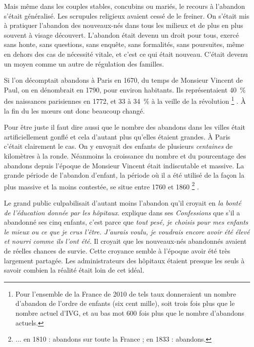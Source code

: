  Mais même dans les couples stables, concubins ou mariés, le recours à l'abandon s'était généralisé. Les scrupules religieux avaient cessé de le freiner. On s'était mis à pratiquer l'abandon des nouveaux-nés dans tous les milieux et de plus en plus souvent à visage découvert. L'abandon était devenu un droit pour tous, exercé sans honte, sans questions, sans enquête, sans formalités, sans poursuites, même en dehors des cas de nécessité vitale, et c'est ce qui était nouveau. C'était devenu un moyen comme un autre de régulation des familles. 
 
  Si l'on décomptait  abandons à Paris en 1670, du temps de Monsieur Vincent de Paul, on en dénombrait  en 1790, pour environ  habitants. Ils représentaient 40~\% des naissances parisiennes en 1772, et 33 à 34~\% à la veille de la révolution%
\footnote{Pour l'ensemble de la France de 2010 de tels taux donneraient un nombre d'abandon de l'ordre de  enfants (six cent mille), soit trois fois plus que le nombre actuel d'IVG, et au bas mot 600 fois plus que le nombre d'abandons actuels.}%
. À la fin du  les mœurs ont donc beaucoup changé.

 Pour être juste il faut dire aussi que le nombre des abandons dans les villes était artificiellement gonflé et cela d'autant plus qu'elles étaient grandes. À Paris c'était clairement le cas. On y envoyait des enfants de plusieurs \emph{centaines} de kilomètres à la ronde. Néanmoins la croissance du nombre et du pourcentage des abandons depuis l'époque de Monsieur Vincent était indiscutable et massive. La grande période de l'abandon d'enfant, la période où il a été utilisé de la façon la plus massive et la moins contestée, se situe entre 1760 et 1860%
\footnote{... en 1810 :  abandons sur toute la France ; en 1833 :  abandons.}%
.

 Le grand public culpabilisait d'autant moins l'abandon qu'il croyait en \emph{la bonté de l'éducation donnée par les hôpitaux}.  explique dans ses \emph{Confessions} que s'il a abandonné ses cinq enfants, c'est parce que \emph{tout pesé, je choisis pour mes enfants le mieux ou ce que je crus l'être. J'aurais voulu, je voudrais encore avoir été élevé et nourri comme ils l'ont été}. Il croyait que les nouveaux-nés abandonnés avaient de réelles chances de survie. Cette croyance semble à l'époque avoir été très largement partagée. Les administrateurs des hôpitaux étaient presque les seuls à savoir combien la réalité était loin de cet idéal. 

